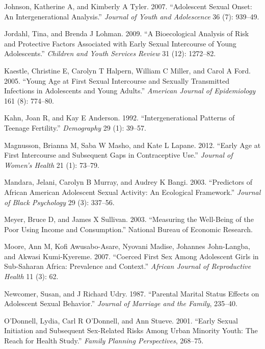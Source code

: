 \documentclass[
]{article}
\newlength{\cslhangindent}
\newenvironment{cslreferences}%
  {\setlength{\parindent}{0pt}%
  \everypar{\setlength{\hangindent}{\cslhangindent}}\ignorespaces}%
  {\par}
\begin{document}
\begin{cslreferences}
\leavevmode\hypertarget{ref-johnson2007adolescent}{}%
Johnson, Katherine A, and Kimberly A Tyler. 2007. ``Adolescent Sexual
Onset: An Intergenerational Analysis.'' \emph{Journal of Youth and
Adolescence} 36 (7): 939--49.

\leavevmode\hypertarget{ref-jordahl2009bioecological}{}%
Jordahl, Tina, and Brenda J Lohman. 2009. ``A Bioecological Analysis of
Risk and Protective Factors Associated with Early Sexual Intercourse of
Young Adolescents.'' \emph{Children and Youth Services Review} 31 (12):
1272--82.

\leavevmode\hypertarget{ref-kaestle2005young}{}%
Kaestle, Christine E, Carolyn T Halpern, William C Miller, and Carol A
Ford. 2005. ``Young Age at First Sexual Intercourse and Sexually
Transmitted Infections in Adolescents and Young Adults.'' \emph{American
Journal of Epidemiology} 161 (8): 774--80.

\leavevmode\hypertarget{ref-kahn1992intergenerational}{}%
Kahn, Joan R, and Kay E Anderson. 1992. ``Intergenerational Patterns of
Teenage Fertility.'' \emph{Demography} 29 (1): 39--57.

\leavevmode\hypertarget{ref-magnusson2012early}{}%
Magnusson, Brianna M, Saba W Masho, and Kate L Lapane. 2012. ``Early Age
at First Intercourse and Subsequent Gaps in Contraceptive Use.''
\emph{Journal of Women's Health} 21 (1): 73--79.

\leavevmode\hypertarget{ref-mandara2003predictors}{}%
Mandara, Jelani, Carolyn B Murray, and Audrey K Bangi. 2003.
``Predictors of African American Adolescent Sexual Activity: An
Ecological Framework.'' \emph{Journal of Black Psychology} 29 (3):
337--56.

\leavevmode\hypertarget{ref-meyer2003measuring}{}%
Meyer, Bruce D, and James X Sullivan. 2003. ``Measuring the Well-Being
of the Poor Using Income and Consumption.'' National Bureau of Economic
Research.

\leavevmode\hypertarget{ref-moore2007coerced}{}%
Moore, Ann M, Kofi Awusabo-Asare, Nyovani Madise, Johannes John-Langba,
and Akwasi Kumi-Kyereme. 2007. ``Coerced First Sex Among Adolescent
Girls in Sub-Saharan Africa: Prevalence and Context.'' \emph{African
Journal of Reproductive Health} 11 (3): 62.

\leavevmode\hypertarget{ref-newcomer1987parental}{}%
Newcomer, Susan, and J Richard Udry. 1987. ``Parental Marital Status
Effects on Adolescent Sexual Behavior.'' \emph{Journal of Marriage and
the Family}, 235--40.

\leavevmode\hypertarget{ref-o2001early}{}%
O'Donnell, Lydia, Carl R O'Donnell, and Ann Stueve. 2001. ``Early Sexual
Initiation and Subsequent Sex-Related Risks Among Urban Minority Youth:
The Reach for Health Study.'' \emph{Family Planning Perspectives},
268--75.


\end{cslreferences}
\end{document}
